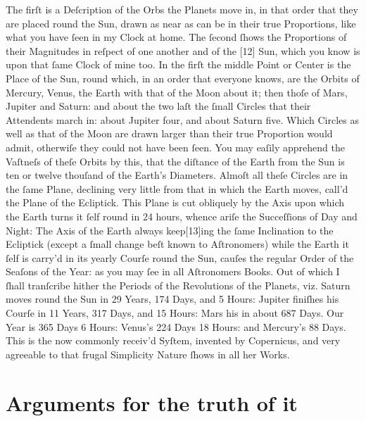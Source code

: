 \documentclass[letterpaper]{book}
\begin{document}
The firſt is a Deſcription of the Orbs the Planets move
in, in that order that they are placed round the Sun, drawn as near as can
be in their true Proportions, like what you have ſeen in my Clock at home.
The ſecond ſhows the Proportions of their Magnitudes in reſpect of one
another and of the [12] Sun, which you know is upon that ſame Clock of mine
too. In the firſt the middle Point or Center is the Place of the Sun, round
which, in an order that everyone knows, are the Orbits of Mercury, Venus,
the Earth with that of the Moon about it; then thoſe of Mars, Jupiter and
Saturn: and about the two laſt the ſmall Circles that their Attendents march
in: about Jupiter four, and about Saturn five. Which Circles as well as that
of the Moon are drawn larger than their true Proportion would admit,
otherwiſe they could not have been ſeen. You may eaſily apprehend the
Vaſtneſs of theſe Orbits by this, that the diſtance of the Earth from the
Sun is ten or twelve thouſand of the Earth's Diameters. Almoſt all theſe
Circles are in the ſame Plane, declining very little from that in which the
Earth moves, call'd the Plane of the Ecliptick. This Plane is cut obliquely
by the Axis upon which the Earth turns it ſelf round in 24 hours, whence
ariſe the Succeſſions of Day and Night: The Axis of the Earth always
keep[13]ing the ſame Inclination to the Ecliptick (except a ſmall change
beſt known to Aſtronomers) while the Earth it ſelf is carry'd in its yearly
Courſe round the Sun, cauſes the regular Order of the Seaſons of the Year:
as you may ſee in all Aſtronomers Books.  Out of which I ſhall tranſcribe
hither the Periods of the Revolutions of the Planets, viz. Saturn moves
round the Sun in 29 Years, 174 Days, and 5 Hours: Jupiter finiſhes his
Courſe in 11 Years, 317 Days, and 15 Hours: Mars his in about 687 Days. Our
Year is 365 Days 6 Hours: Venus's 224 Days 18 Hours: and Mercury's 88 Days.
This is the now commonly receiv'd Syſtem, invented by Copernicus, and very
agreeable to that frugal Simplicity Nature ſhows in all her Works.


\section{Arguments for the truth of it}
\end{document}
